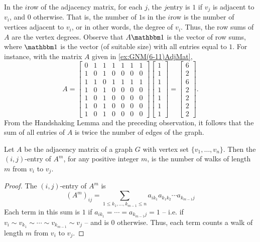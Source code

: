 In the $i$\nth row of the adjacency matrix, for each $j$, the $j$\nth entry is $1$ if $v_j$ is adjacent to $v_i$, and $0$ otherwise. That is, the number of $1$s in the $i$\nth row is the number of vertices adjacent to $v_i$, or in other words, the degree of $v_i$. Thus, the row sums of $A$ are the vertex degrees. Observe that $A \mathbbm 1$ is the vector of row sums, where $\mathbbm 1$ is the vector (of suitable size) with all entries equal to $1$. For instance, with the matrix $A$ given in \cref{ex:GNM(6-11)AdjMat},
\begin{equation*}
A = \begin{bmatrix}
0 & 1 & 1 & 1 & 1 & 1 & 1 \\
1 & 0 & 1 & 0 & 0 & 0 & 0 \\
1 & 1 & 0 & 1 & 1 & 1 & 1 \\
1 & 0 & 1 & 0 & 0 & 0 & 0 \\
1 & 0 & 1 & 0 & 0 & 0 & 0 \\
1 & 0 & 1 & 0 & 0 & 0 & 0 \\
1 & 0 & 1 & 0 & 0 & 0 & 0
\end{bmatrix}
\begin{bmatrix}
1 \\ 1 \\ 1 \\ 1 \\ 1 \\ 1 \\ 1
\end{bmatrix} =
\begin{bmatrix}
6 \\ 2 \\ 6 \\ 2 \\ 2 \\ 2 \\ 2
\end{bmatrix}.
\end{equation*}
From the Handshaking Lemma and the preceding observation, it follows that the sum of all entries of $A$ is twice the number of edges of the graph.

\begin{Theorem}
Let $A$ be the adjacency matrix of a graph $G$ with vertex set $\{v_1, \ldots, v_n\}$. Then the $(i,j)$-entry of $A^m$, for any positive integer $m$, is the number of walks of length $m$ from $v_i$ to $v_j$.
\end{Theorem}

\begin{proof}
The $(i,j)$-entry of $A^m$ is
\begin{equation*}
(A^m)_{ij} = \sum_{1 \le k_1, \ldots, k_{m-1} \le n} a_{i k_1} a_{k_1 k_2} \cdots a_{k_{m-1} j}
\end{equation*}
Each term in this sum is $1$ if $a_{i k_1} = \cdots = a_{k_{m-1} j} = 1$ -- i.e. if $v_i \sim v_{k_1} \sim \cdots \sim v_{k_{m-1}} \sim v_j$ -- and is $0$ otherwise. Thus, each term counts a walk of length $m$ from $v_i$ to $v_j$.
\end{proof}

